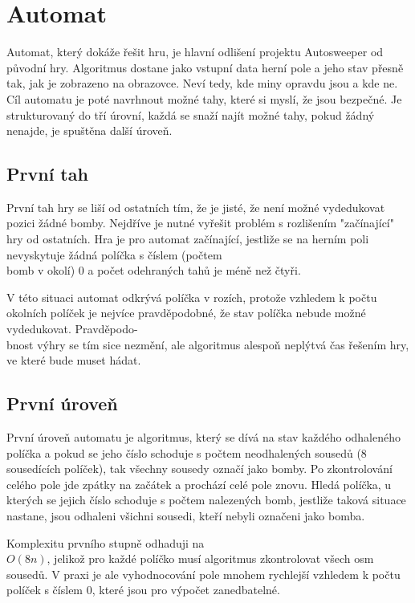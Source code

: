 \section{Automat}
Automat, který dokáže řešit hru, je hlavní odlišení projektu Autosweeper od původní hry. Algoritmus dostane jako vstupní data
herní pole a jeho stav přesně tak, jak je zobrazeno na obrazovce. Neví tedy, kde miny opravdu jsou a kde ne. Cíl automatu je
poté navrhnout možné tahy, které si myslí, že jsou bezpečné. Je strukturovaný do tří úrovní, každá se snaží najít možné tahy,
pokud žádný nenajde, je spuštěna další úroveň.

\subsection{První tah}
První tah hry se liší od ostatních tím, že je jisté, že není možné vydedukovat pozici žádné bomby. Nejdříve je nutné vyřešit
problém s rozlišením "začínající" hry od ostatních. Hra je pro automat začínající, jestliže se na herním poli nevyskytuje
žádná políčka s číslem (počtem \\bomb v okolí) 0 a počet odehraných tahů je méně než čtyři.

V této situaci automat odkrývá políčka v rozích, protože vzhledem k počtu okolních políček je nejvíce pravděpodobné, že stav
políčka nebude možné vydedukovat. \autocite{bercerra2015} Pravděpodo-\\bnost výhry se tím sice nezmění, ale algoritmus alespoň 
neplýtvá čas řešením hry, ve které bude muset hádat.

\subsection{První úroveň}
První úroveň automatu je algoritmus, který se dívá na stav každého odhaleného políčka a pokud se jeho číslo schoduje s počtem
neodhalených sousedů (8 sousedících políček), tak všechny sousedy označí jako bomby. Po zkontrolování celého pole jde zpátky na
začátek a prochází celé pole znovu. Hledá políčka, u kterých se jejich číslo schoduje s počtem nalezených bomb, jestliže taková
situace nastane, jsou odhaleni všichni sousedi, kteří nebyli označeni jako bomba.

Komplexitu prvního stupně odhaduji na \\$O(8n)$, jelikož pro každé políčko musí algoritmus zkontrolovat všech osm sousedů.
V praxi je ale vyhodnocování pole mnohem rychlejší vzhledem k počtu políček s číslem 0, které jsou pro výpočet zanedbatelné.

